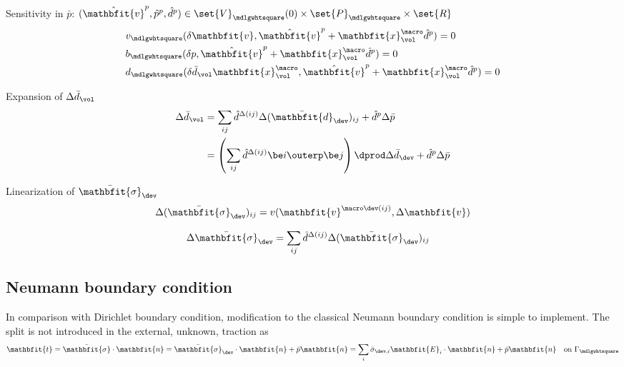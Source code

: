 \documentclass[a4paper,11pt]{article}
\renewcommand{\ta}[1]{\mathbfit{#1}}
\renewcommand{\ts}[1]{\mathbfit{#1}}
\renewcommand{\Box}{\mdlgwhtsquare}
\begin{document}
Sensitivity in $\bar p$: $(\hat{\ta v}^{p}, \hat{p}^{p}, \hat{d}^{p}) \in \set{V}_\Box(0)\times \set{P}_\Box \times\set{R}$
\begin{align}
 &v_\Box(\delta\ta v, \hat{\ta v}^{p}+\ta x^\macro_\vol \hat{d}^{p}) = 0
 \\
 &b_\Box(\delta p,\hat{\ta v}^{p} + \ta x^\macro_\vol \hat{d}^{p}) = 0
 \\
 &d_\Box(\delta\bar{d}_\vol \ta x^\macro_\vol, \hat{\ta v}^{p}+\ta x^\macro_\vol \hat{d}^{p}) = 0
\end{align}

Expansion of $\Delta\bar{d}_\vol$
\begin{align}
 \nonumber \Delta\bar{d}_\vol &= \sum_{ij} \hat{d}^{\Delta(ij)} \Delta(\bar{\ts d}_\dev)_{ij} + \hat{d}^p\Delta\bar{p}\\
 &= \left(\sum_{ij} \hat{d}^{\Delta(ij)} \be i\outerp \be j\right) \dprod \Delta\bar{d}_\dev + \hat{d}^p \Delta\bar{p}
\end{align}

Linearization of $\bar{\ts\sigma}_\dev$
\begin{align}
 \Delta(\bar{\ts\sigma}_\dev)_{ij} = v(\ta v^{\macro\dev(ij)}, \Delta\ta v) 
\end{align}


\begin{align}
  \Delta\bar{\ts\sigma}_\dev &= \sum_{ij} \hat{d}^{\Delta(ij)} \Delta(\bar{\ts\sigma}_\dev)_{ij}
\end{align}

\subsection{Neumann boundary condition}
In comparison with Dirichlet boundary condition, modification to the classical Neumann boundary condition is simple to implement.
The split is not introduced in the external, unknown, traction as
\begin{align}
 \ta t = \bar{\ts\sigma}\cdot\ta n = \bar{\ts\sigma}_\dev\cdot\ta n + \bar p \ta n = \sum_i \bar{\sigma}_{\dev,i} \ts E_i\cdot \ta n + \bar p \ta n \quad \text{on }\Gamma_\Box
\end{align}
\end{document}
